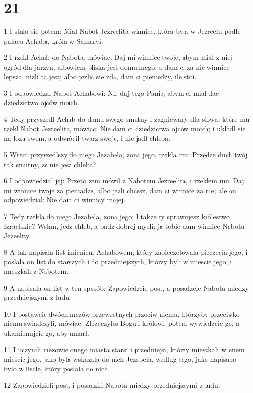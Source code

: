 \chapter{21}

\par 1 I stalo sie potem: Mial Nabot Jezreelita winnice, która byla w Jezreelu podle palacu Achaba, króla w Samaryi.
\par 2 I rzekl Achab do Nabota, mówiac: Daj mi winnice twoje, abym mial z niej ogród dla jarzyn, albowiem bliska jest domu mego; a dam ci za nie winnice lepsza, nizli ta jest; albo jezlic sie zda, dam ci pieniedzy, ile stoi.
\par 3 I odpowiedzal Nabot Achabowi: Nie daj tego Panie, abym ci mial dac dziedzictwo ojców moich.
\par 4 Tedy przyszedl Achab do domu swego smutny i zagniewany dla slowa, które mu rzekl Nabot Jezreelita, mówiac: Nie dam ci dziedzictwa ojców moich; i ukladl sie na lozu swem, a odwrócil twarz swoje, i nie jadl chleba.
\par 5 Wtem przyszedlszy do niego Jezabela, zona jego, rzekla mu: Przedze duch twój tak smutny, ze nie jesz chleba?
\par 6 I odpowiedzial jej: Przeto zem mówil z Nabotem Jezreelita, i rzeklem mu: Daj mi winnice twoje za pieniadze, albo jezli chcesz, dam ci winnice za nie; ale on odpowiedzial: Nie dam ci winnicy mojej.
\par 7 Tedy rzekla do niego Jezabela, zona jego: I takze ty sprawujesz królestwo Izraelskie? Wstan, jedz chleb, a badz dobrej mysli; ja tobie dam winnice Nabota Jezeelity.
\par 8 A tak napisala list imieniem Achabowem, który zapieczetowala pieczecia jego, i poslala on list do starszych i do przedniejszych, którzy byli w miescie jego, i mieszkali z Nabotem.
\par 9 A napisala on list w ten sposób: Zapowiedzcie post, a posadzcie Nabota miedzy przedniejszymi z ludu;
\par 10 I postawcie dwóch mezów przewrotnych przeciw niemu, którzyby przeciwko niemu swiadczyli, mówiac: Zlozeczyles Bogu i królowi; potem wywiedzcie go, a ukamionujcie go, aby umarl.
\par 11 I uczynili mezowie onego miasta starsi i przedniejsi, którzy mieszkali w onem miescie jego, jako byla wskazala do nich Jezabela, wedlug tego, jako napisano bylo w liscie, który poslala do nich.
\par 12 Zapowiedzieli post, i posadzili Nabota miedzy przedniejszymi z ludu.
